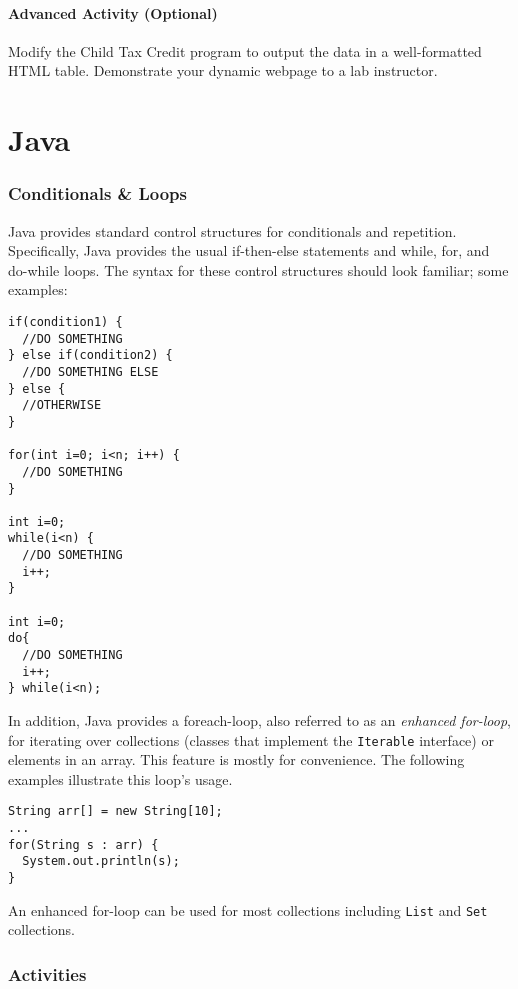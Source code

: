 \documentclass[12pt]{scrartcl}
\begin{document}
\subsection*{Advanced Activity (Optional)}
	
Modify the Child Tax Credit program to output the data in a 
well-formatted HTML table.  Demonstrate your dynamic webpage 
to a lab instructor.


\newpage
\part*{Java}

\section*{Conditionals \& Loops}

Java provides standard control structures for conditionals and 
repetition.  Specifically, Java provides the usual if-then-else 
statements and while, for, and do-while loops.  The syntax for 
these control structures should look familiar; some examples:

\begin{verbatim}
if(condition1) {
  //DO SOMETHING
} else if(condition2) {
  //DO SOMETHING ELSE
} else {
  //OTHERWISE
}

for(int i=0; i<n; i++) {
  //DO SOMETHING
}

int i=0;
while(i<n) {
  //DO SOMETHING
  i++;
}

int i=0;
do{ 
  //DO SOMETHING
  i++;
} while(i<n);
\end{verbatim}

In addition, Java provides a foreach-loop, also referred to as an 
\emph{enhanced for-loop}, for iterating over collections (classes 
that implement the \texttt{Iterable} interface) or elements 
in an array.  This feature is mostly for convenience.  The following 
examples illustrate this loop's usage.

\begin{verbatim}
String arr[] = new String[10];
...
for(String s : arr) {
  System.out.println(s); 
}
\end{verbatim}

An enhanced for-loop can be used for most collections including
\texttt{List} and \texttt{Set} collections.

\section*{Activities}
\end{document}
